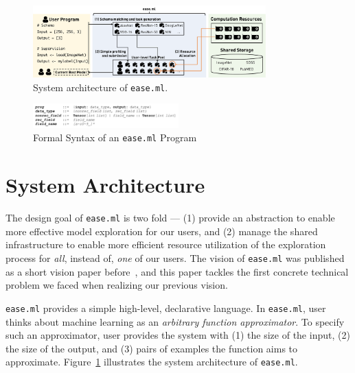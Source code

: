 \documentclass[letterpaper]{vldb}
\newcommand{\eml}{\texttt{ease.ml}\xspace}
\begin{document}
\begin{figure}
\centering
\includegraphics[width=0.8\textwidth]{figures/easeml}
\vspace{-1em}
\caption{System architecture of \texttt{ease.ml}.}
\label{fig:architecture}
\vspace{-1em}
\end{figure}


\begin{figure}[t]
\centering
\includegraphics[width=0.5\textwidth]{figures/syntax}
\vspace{-2em}
\caption{Formal Syntax of an \eml Program}
\label{fig:syntax}
\vspace{-1em}
\end{figure}


\newpage
\vspace{-1em}
\section{System Architecture} \label{sec:architecture}

The design goal of \eml is two fold --- (1) provide an abstraction
to enable more effective model exploration for our users, and 
(2) manage the shared infrastructure to enable more efficient
resource utilization of the exploration process 
for {\em all}, instead of, {\em one} of our users.
The vision of \eml was published as a short vision paper
before~\cite{HILDA}, and this paper tackles the first
concrete technical problem we faced when realizing our
previous vision.

\eml provides a simple high-level, declarative language.
In \eml, user thinks about machine learning as an {\em arbitrary function approximator}.
To specify such an approximator, user provides the
system with (1) the size of the input, (2) the size of the output,
and (3) pairs of examples the function aims to approximate.
Figure~\ref{fig:architecture} illustrates the system architecture of \eml.
\end{document}
